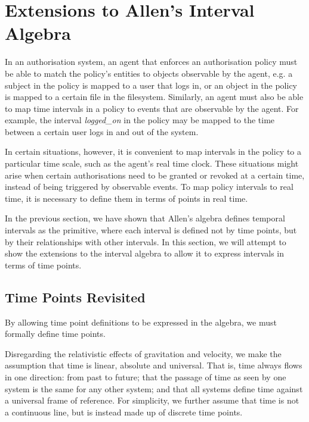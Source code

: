 \documentclass[11pt]{report}
\begin{document}
    \section{Extensions to Allen's Interval Algebra}

      In an authorisation system, an agent that enforces an authorisation
      policy must be able to match the policy's entities to objects observable
      by the agent, e.g. a subject in the policy is mapped to a user that logs
      in, or an object in the policy is mapped to a certain file in the
      filesystem. Similarly, an agent must also be able to map time intervals
      in a policy to events that are observable by the agent. For example,
      the interval {\em logged\_on} in the policy may be mapped to the time
      between a certain user logs in and out of the system.

      In certain situations, however, it is convenient to map intervals in the
      policy to a particular time scale, such as the agent's real time clock.
      These situations might arise when certain authorisations need to be
      granted or revoked at a certain time, instead of being triggered by
      observable events. To map policy intervals to real time, it is necessary
      to define them in terms of points in real time.

      In the previous section, we have shown that Allen's algebra defines
      temporal intervals as the primitive, where each interval is defined not
      by time points, but by their relationships with other intervals. In this
      section, we will attempt to show the extensions to the interval algebra
      to allow it to express intervals in terms of time points.

      \subsection{Time Points Revisited}

        By allowing time point definitions to be expressed in the algebra, we must
        formally define time points.

        Disregarding the relativistic effects of gravitation and velocity, we make the
        assumption that time is linear, absolute and universal. That is, time always
        flows in one direction: from past to future; that the passage of time as seen
        by one system is the same for any other system; and that all systems define
        time against a universal frame of reference. For simplicity, we further assume
        that time is not a continuous line, but is instead made up of discrete time
        points.
\end{document}
